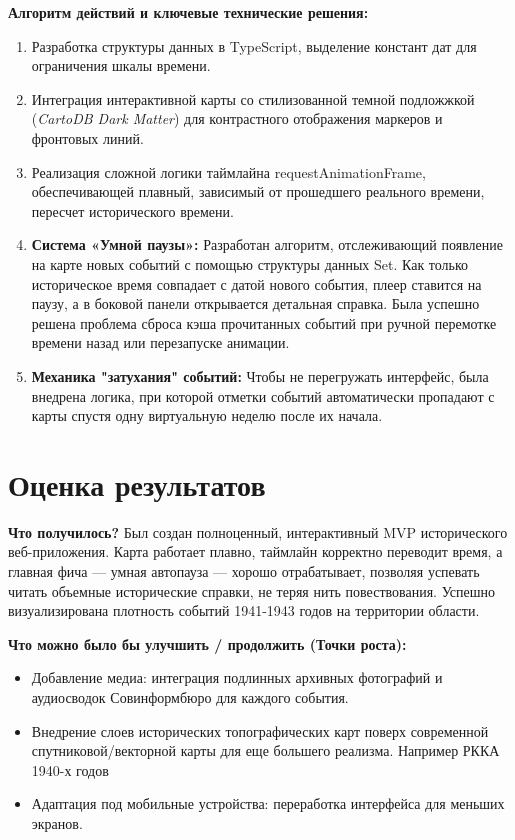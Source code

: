 \documentclass[a4paper,12pt]{article}
\begin{document}
\textbf{Алгоритм действий и ключевые технические решения:}
\begin{enumerate}
    \item Разработка структуры данных в TypeScript, выделение констант дат для ограничения шкалы времени.
    \item Интеграция интерактивной карты со стилизованной темной подложжкой (\textit{CartoDB Dark Matter}) для контрастного отображения маркеров и фронтовых линий.
    \item Реализация сложной логики таймлайна requestAnimationFrame, обеспечивающей плавный, зависимый от прошедшего реального времени, пересчет исторического времени.
    \item \textbf{Система «Умной паузы»:} Разработан алгоритм, отслеживающий появление на карте новых событий с помощью структуры данных Set. Как только историческое время совпадает с датой нового события, плеер ставится на паузу, а в боковой панели открывается детальная справка. Была успешно решена проблема сброса кэша прочитанных событий при ручной перемотке времени назад или перезапуске анимации.
    \item \textbf{Механика "затухания" событий:} Чтобы не перегружать интерфейс, была внедрена логика, при которой отметки событий автоматически пропадают с карты спустя одну виртуальную неделю после их начала. 
\end{enumerate}

\section*{Оценка результатов}
\textbf{Что получилось?} 
Был создан полноценный, интерактивный MVP исторического веб-приложения. Карта работает плавно, таймлайн корректно переводит время, а главная фича — умная автопауза — хорошо отрабатывает, позволяя успевать читать объемные исторические справки, не теряя нить повествования. Успешно визуализирована плотность событий 1941-1943 годов на территории области.

\textbf{Что можно было бы улучшить / продолжить (Точки роста):}
\begin{itemize}
    \item Добавление медиа: интеграция подлинных архивных фотографий и аудиосводок Совинформбюро для каждого события.
    \item Внедрение слоев исторических топографических карт поверх современной спутниковой/векторной карты для еще большего реализма. Например РККА 1940-х годов
    \item Адаптация под мобильные устройства: переработка интерфейса для меньших экранов.
\end{itemize}
\end{document}
